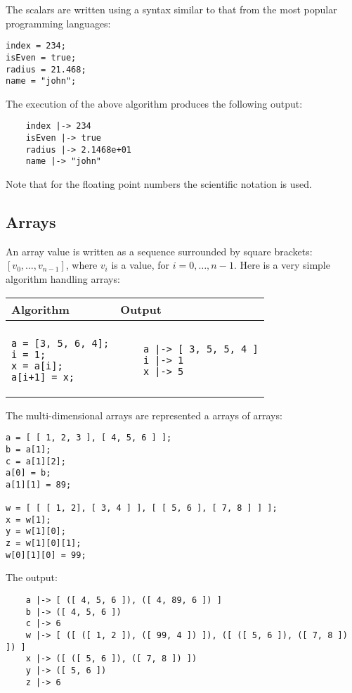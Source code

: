 \documentclass[a4paper]{report}
\begin{document}
The scalars are written using a syntax similar to that from the most popular programming languages: 
\begin{verbatim}
index = 234;
isEven = true;
radius = 21.468;
name = "john";
\end{verbatim}
The execution of the above algorithm produces the following output:
\begin{verbatim}
    index |-> 234
    isEven |-> true
    radius |-> 2.1468e+01
    name |-> "john"
\end{verbatim}
Note that for the floating point numbers the scientific notation is used.

\subsection{Arrays}

An array value is written as a sequence surrounded by square brackets: $[v_0,\ldots,v_{n-1}]$, where $v_i$ is a value, for $i=0,\ldots,n-1$.
Here is a very simple algorithm handling arrays:
\begin{center}
\begin{tabular}{ll}
Algorithm & Output\\
\hline
\\
\begin{minipage}{.35\textwidth}
\begin{verbatim}
a = [3, 5, 6, 4];
i = 1;
x = a[i];
a[i+1] = x;
\end{verbatim}
\end{minipage}
&
\begin{minipage}{.3\textwidth}
\begin{verbatim}
    a |-> [ 3, 5, 5, 4 ]
    i |-> 1
    x |-> 5
\end{verbatim}
\end{minipage}
\end{tabular}
\end{center}
The multi-dimensional arrays are represented a arrays of arrays:
\begin{verbatim}
a = [ [ 1, 2, 3 ], [ 4, 5, 6 ] ]; 
b = a[1];
c = a[1][2];
a[0] = b;
a[1][1] = 89;

w = [ [ [ 1, 2], [ 3, 4 ] ], [ [ 5, 6 ], [ 7, 8 ] ] ];
x = w[1];
y = w[1][0];
z = w[1][0][1];
w[0][1][0] = 99;
\end{verbatim}
The output:
\begin{verbatim}
    a |-> [ ([ 4, 5, 6 ]), ([ 4, 89, 6 ]) ]
    b |-> ([ 4, 5, 6 ])
    c |-> 6
    w |-> [ ([ ([ 1, 2 ]), ([ 99, 4 ]) ]), ([ ([ 5, 6 ]), ([ 7, 8 ]) ]) ]
    x |-> ([ ([ 5, 6 ]), ([ 7, 8 ]) ])
    y |-> ([ 5, 6 ])
    z |-> 6
\end{verbatim}
\end{document}

